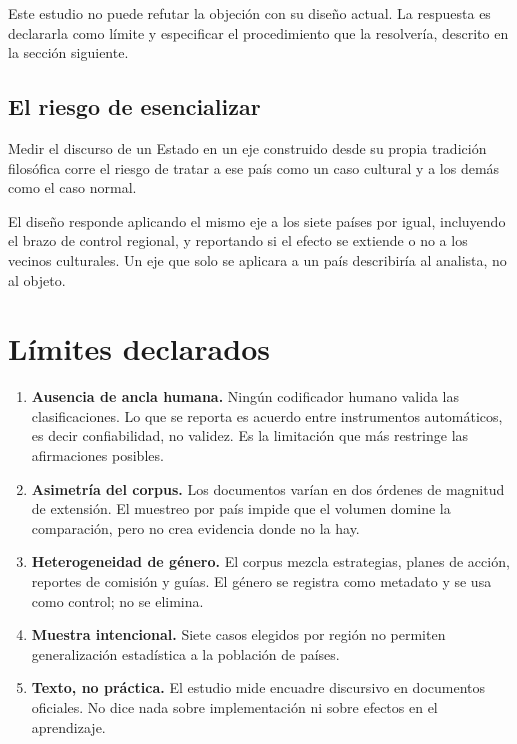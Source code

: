 \documentclass[12pt,letterpaper]{article}
\begin{document}
Este estudio no puede refutar la objeción con su diseño actual. La respuesta es declararla como límite y especificar el procedimiento que la resolvería, descrito en la sección siguiente.

\subsection{El riesgo de esencializar}

Medir el discurso de un Estado en un eje construido desde su propia tradición filosófica corre el riesgo de tratar a ese país como un caso cultural y a los demás como el caso normal.

El diseño responde aplicando el mismo eje a los siete países por igual, incluyendo el brazo de control regional, y reportando si el efecto se extiende o no a los vecinos culturales. Un eje que solo se aplicara a un país describiría al analista, no al objeto.


\section{Límites declarados}

\begin{enumerate}[leftmargin=*]
  \item \textbf{Ausencia de ancla humana.} Ningún codificador humano valida las clasificaciones. Lo que se reporta es acuerdo entre instrumentos automáticos, es decir confiabilidad, no validez. Es la limitación que más restringe las afirmaciones posibles.

  \item \textbf{Asimetría del corpus.} Los documentos varían en dos órdenes de magnitud de extensión. El muestreo por país impide que el volumen domine la comparación, pero no crea evidencia donde no la hay.

  \item \textbf{Heterogeneidad de género.} El corpus mezcla estrategias, planes de acción, reportes de comisión y guías. El género se registra como metadato y se usa como control; no se elimina.

  \item \textbf{Muestra intencional.} Siete casos elegidos por región no permiten generalización estadística a la población de países.

  \item \textbf{Texto, no práctica.} El estudio mide encuadre discursivo en documentos oficiales. No dice nada sobre implementación ni sobre efectos en el aprendizaje.
\end{enumerate}
\end{document}
